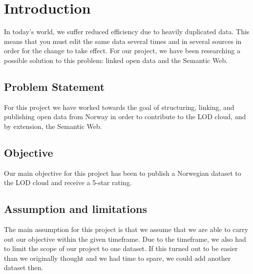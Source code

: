 \chapter{Introduction}
In today’s world, we suffer reduced efficiency due to heavily duplicated data. This means that you must edit the same data several times and in several sources in order for the change to take effect. For our project, we have been researching a possible solution to this problem: linked open data and the Semantic Web.

\section{Problem Statement}
For this project we have worked towards the goal of structuring, linking, and publishing open data from Norway in order to contribute to the LOD cloud, and by extension, the Semantic Web.

\section{Objective}
Our main objective for this project has been to publish a Norwegian dataset to the LOD cloud and receive a 5-star rating.

\section{Assumption and limitations}
The main assumption for this project is that we assume that we are able to carry out our objective within the given timeframe. Due to the timeframe, we also had to limit the scope of our project to one dataset. If this turned out to be easier than we originally thought and we had time to spare, we could add another dataset then.
